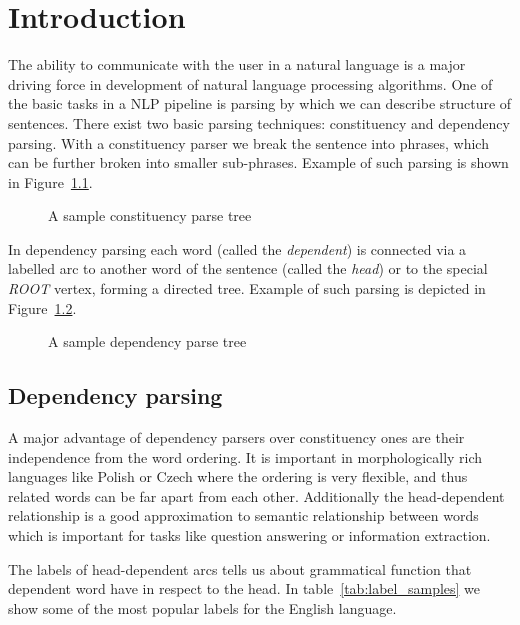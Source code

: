 \chapter{Introduction}
The ability to communicate with the user in a natural language is a major driving
force in development of natural language processing algorithms. One of the basic
tasks in a NLP pipeline is parsing by which we can describe structure of sentences.
There exist two basic parsing techniques: constituency and dependency parsing.
With a constituency parser we break the sentence into phrases, which can be further
broken into smaller sub-phrases. Example of such parsing is shown in Figure~\ref{fig:constituency_tree}.

\begin{figure}[!htbp]
  \centering
  \caption{A sample constituency parse tree} 
  \label{fig:constituency_tree}
\end{figure}

In dependency parsing each word (called the \emph{dependent})
is connected via a labelled arc to another word of the sentence (called the \emph{head})
or to the special \emph{ROOT} vertex, forming a directed tree.
Example of such parsing is depicted in Figure~\ref{fig:dependency_tree}.

\begin{figure}[!htbp]
  \centering
  \caption{A sample dependency parse tree} 
  \label{fig:dependency_tree}
\end{figure}

\section{Dependency parsing}

A major advantage of dependency parsers over constituency ones are their
independence from the word ordering. It is important in morphologically rich
languages like Polish or Czech where the ordering is very flexible, and thus
related words can be far apart from each other.
Additionally the head-dependent relationship is a good approximation to semantic
relationship between words~\cite{covington_fundamental_2001} which is important
for tasks like question answering or information extraction.

The labels of head-dependent arcs tells us about grammatical function that
dependent word have in respect to the head. In table~\ref{tab:label_samples}
we show some of the most popular labels for the English language.

